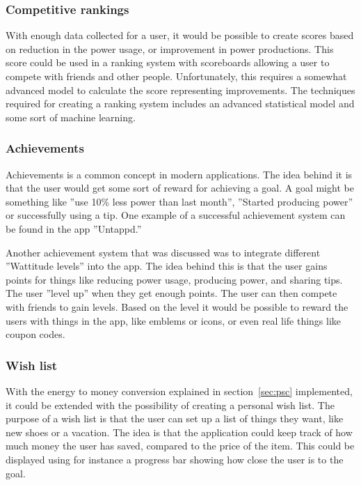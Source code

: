 \subsubsection{Competitive rankings}
With enough data collected for a user, it would be possible to create scores based on reduction in the power usage, or improvement in power productions. This score could be used in a ranking system with scoreboards allowing a user to compete with friends and other people. Unfortunately, this requires a somewhat advanced model to calculate the score representing improvements. The techniques required for creating a ranking system includes an advanced statistical model and some sort of machine learning. 

\subsubsection{Achievements}
Achievements is a common concept in modern applications. The idea behind it is that the user would get some sort of reward for achieving a goal. A goal might be something like ''use 10\% less power than last month'', ''Started producing power'' or successfully using a tip.
One example of a successful achievement system can be found in the app ''Untappd.''~\cite{untappd}

Another achievement system that was discussed was to integrate different ''Wattitude levels'' into the app. The idea behind this is that the user gains points for things like reducing power usage, producing power, and sharing tips. The user ''level up'' when they get enough points. The user can then compete with friends to gain levels. Based on the level it would be possible to reward the users with things in the app, like emblems or icons, or even real life things like coupon codes.

\subsubsection{Wish list}
With the energy to money conversion explained in section~\ref{sec:psc} implemented, it could be extended with the possibility of creating a personal wish list. 
The purpose of a wish list is that the user can set up a list of things they want, like new shoes or a vacation. The idea is that the application could keep track of how much money the user has saved, compared to the price of the item. This could be displayed using for instance a progress bar showing how close the user is to the goal.
\newpage